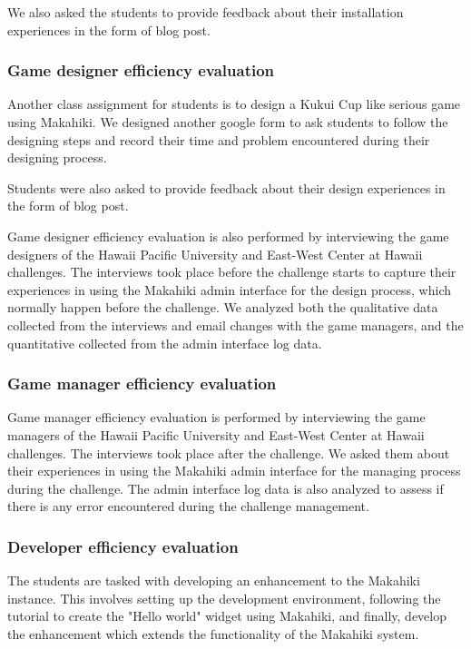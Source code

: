 \documentclass{sigchi}
\begin{document}
We also asked the students to provide feedback about their installation experiences in the form of blog post.

\subsubsection{Game designer efficiency evaluation}

Another class assignment for students is to design a Kukui Cup like serious game using Makahiki. We designed another google form to ask students to follow the designing steps and record their time and problem encountered during their designing process.

Students were also asked to provide feedback about their design experiences in the form of blog post.

Game designer efficiency evaluation is also performed by interviewing the game designers of the Hawaii Pacific University and East-West Center at Hawaii challenges. The interviews took place before the challenge starts to capture their experiences in using the Makahiki admin interface for the design process, which normally happen before the challenge. We analyzed both the qualitative data collected from the interviews and email changes with the game managers, and the quantitative collected from the admin interface log data.

\subsubsection{Game manager efficiency evaluation}
Game manager efficiency evaluation is performed by interviewing the game managers of the Hawaii Pacific University and East-West Center at Hawaii challenges. The interviews took place after the challenge. We asked them about their experiences in using the Makahiki admin interface for the managing process during the challenge. The admin interface log data is also analyzed to assess if there is any error encountered during the challenge management.

\subsubsection{Developer efficiency evaluation}

The students are tasked with developing an enhancement to the Makahiki instance. This involves setting up the development environment, following the tutorial to create the "Hello world" widget using Makahiki, and finally, develop the enhancement which extends the functionality of the Makahiki system.
\end{document}
